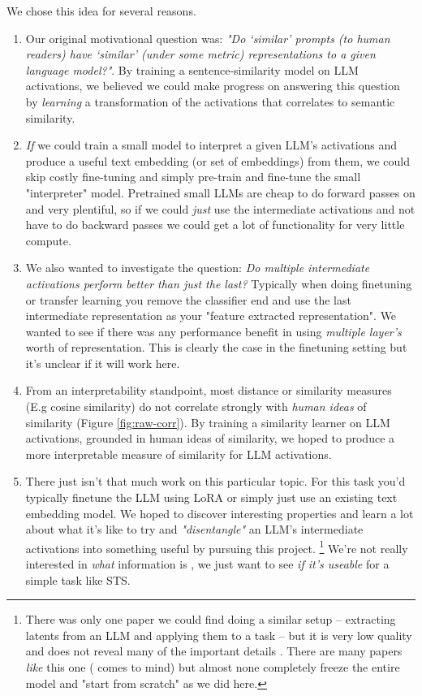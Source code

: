 \documentclass{article}
\begin{document}
We chose this idea for several reasons.
\begin{enumerate}
    \item Our original motivational question was: \textit{"Do ‘similar’ prompts (to human readers) have ‘similar’ (under some metric) representations to a given language model?"}. By training a sentence-similarity model on LLM activations, we believed we could make progress on answering this question by \textit{learning} a transformation of the activations that correlates to semantic similarity.

    \item \textit{If} we could train a small model to interpret a given LLM's activations and produce a useful text embedding (or set of embeddings) from them, we could skip costly fine-tuning and simply pre-train and fine-tune the small "interpreter" model. Pretrained small LLMs are cheap to do forward passes on and very plentiful, so if we could \textit{just} use the intermediate activations and not have to do backward passes we could get a lot of functionality for very little compute.
    
    \item We also wanted to investigate the question: \textit{Do multiple intermediate activations perform better than just the last?} Typically when doing finetuning or transfer learning you remove the classifier end and use the last intermediate representation as your "feature extracted representation". We wanted to see if there was any performance benefit in using \textit{multiple layer's} worth of representation. This is clearly the case in the finetuning setting \cite{tang2024poolingattentioneffectivedesigns} but it's unclear if it will work here.
    
    \item From an interpretability standpoint, most distance or similarity measures (E.g cosine similarity) do not correlate strongly with \textit{human ideas} of similarity (Figure \ref{fig:raw-corr}). By training a similarity learner on LLM activations, grounded in human ideas of similarity, we hoped to produce a more interpretable measure of similarity for LLM activations.
    
    \item There just isn't that much work on this particular topic. For this task you'd typically finetune the LLM using LoRA \cite{hu2021loralowrankadaptationlarge} or simply just use an existing text embedding model. We hoped to discover interesting properties and learn a lot about what it's like to try and \textit{"disentangle"} an LLM's intermediate activations into something useful by pursuing this project. \footnote{There was only one paper we could find doing a similar setup -- extracting latents from an LLM and applying them to a task -- but it is very low quality and does not reveal many of the important details \cite{gpt2malware}. There are many papers \textit{like} this one (\cite{lu2021pretrainedtransformersuniversalcomputation} comes to mind) but almost none completely freeze the entire model and "start from scratch" as we did here.} We're not really interested in \textit{what} information is , we just want to see \textit{if it's useable} for a simple task like STS.
    

\end{enumerate}
\end{document}
